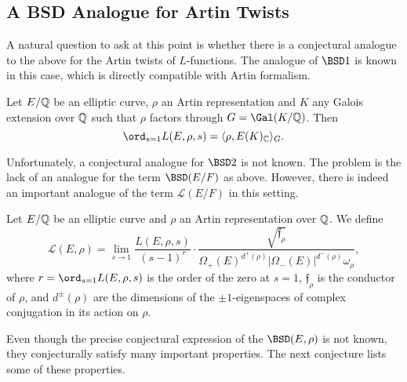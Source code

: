 \subsection{A BSD Analogue for Artin Twists}

A natural question to ask at this point is whether there is a conjectural analogue to the above for the Artin twists of $L$-functions. The analogue of $\BSD1$ is known in this case, which is directly compatible with Artin formalism.

\begin{conj}
    Let $E/\mathbb{Q}$ be an elliptic curve, $\rho$ an Artin representation and $K$ any Galois extension over $\mathbb{Q}$ such that $\rho$ factors through $G=\Gal(K/\QQ)$. Then
    $$\ord_{s=1}L(E,\rho,s)=\langle\rho,E(K)_\CC\rangle_G.$$
\end{conj}

Unfortunately, a conjectural analogue for $\BSD2$ is not known. The problem is the lack of an analogue for the term $\BSD(E/F)$ as above. However, there is indeed an important analogue of the term $\mathcal{L}(E/F)$ in this setting.

\begin{notation}
    Let $E/\mathbb{Q}$ be an elliptic curve and $\rho$ an Artin representation over $\mathbb{Q}$. We define
    $$\mathcal{L}(E,\rho)=\lim_{s\to1}\frac{L(E,\rho,s)}{(s-1)^r}\cdot\frac{\sqrt{\mathfrak{f}_\rho}}{\Omega_+(E)^{d^+(\rho)}|\Omega_-(E)|^{d^-(\rho)}\omega_\rho},$$
    where $r = \ord_{s=1} L(E, \rho, s)$ is the order of the zero at $s = 1$, $\mathfrak{f}_\rho$ is the conductor of $\rho$, and $d^{\pm}(\rho)$ are the dimensions of the $\pm1$-eigenspaces of complex conjugation in its action on $\rho$.
\end{notation}

Even though the precise conjectural expression of the $\BSD(E,\rho)$ is not known, they conjecturally satisfy many important properties. The next conjecture lists some of these properties.

